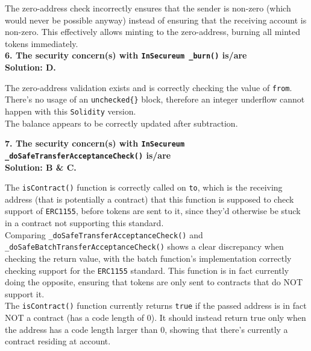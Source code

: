 The zero-address check incorrectly ensures that the sender is non-zero (which would never be possible anyway) instead of ensuring that the receiving account is non-zero.
This effectively allows minting to the zero-address, burning all minted tokens immediately.\\

\textbf{6. The security concern(s) with \texttt{InSecureum \_burn()} is/are}\label{sec:race5_q6}\\

\textbf{Solution: D.}

The zero-address validation exists and is correctly checking the value of \verb|from|.\\

There's no usage of an \verb|unchecked{}| block, therefore an integer underflow cannot happen with this \verb|Solidity| version.\\

The balance appears to be correctly updated after subtraction.\\

\pagebreak

\textbf{7. The security concern(s) with \texttt{InSecureum}\\\texttt{\_doSafeTransferAcceptanceCheck()} is/are}\label{sec:race5_q7}\\

\textbf{Solution: B \& C.}

The \verb|isContract()| function is correctly called on \verb|to|, which is the receiving address (that is potentially a contract) that this function is supposed to check support of \verb|ERC1155|, before tokens are sent to it, since they'd otherwise be stuck in a contract not supporting this standard.\\

Comparing \verb|_doSafeTransferAcceptanceCheck()| and\\\verb|_doSafeBatchTransferAcceptanceCheck()| shows a clear discrepancy when checking the return value, with the batch function's implementation correctly checking support for the \verb|ERC1155| standard.
This function is in fact currently doing the opposite, ensuring that tokens are only sent to contracts that do NOT support it.\\

The \verb|isContract()| function currently returns \verb|true| if the passed address is in fact NOT a contract (has a code length of 0).
It should instead return true only when the address has a code length larger than 0, showing that there's currently a contract residing at account.\\

